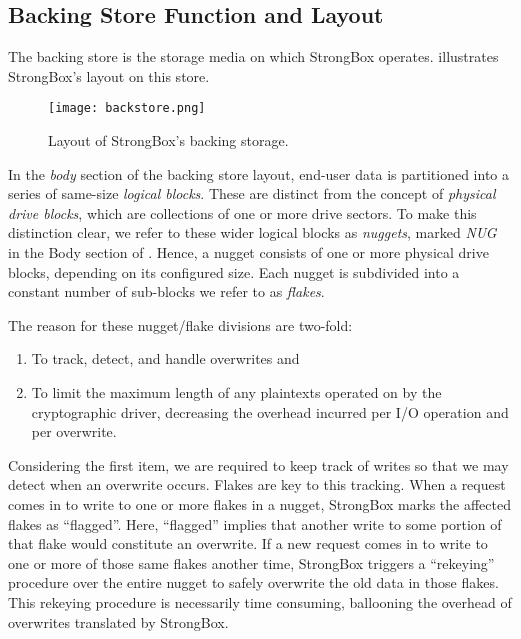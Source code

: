 \subsection{Backing Store Function and Layout}

The backing store is the storage media on which StrongBox operates.
 illustrates StrongBox's layout on this store.

\begin{figure}[t]
 \centering
  \texttt{[image: backstore.png]}
   \caption{Layout of StrongBox's backing storage.}\label{fig:backstore}
\end{figure}

In the \textit{body} section of the backing store layout, end-user data is
partitioned into a series of same-size \emph{logical blocks}. These are distinct
from the concept of \emph{physical drive blocks}, which are collections of one
or more drive sectors. To make this distinction clear, we refer to these wider
logical blocks as \emph{nuggets}, marked \textit{NUG} in the Body section of
. Hence, a nugget consists of one or more physical drive
blocks, depending on its configured size. Each nugget is subdivided into a
constant number of sub-blocks we refer to as \emph{flakes}.

The reason for these nugget/flake divisions are two-fold:

\begin{enumerate}

\item To track, detect, and handle overwrites and

\item To limit the maximum length of any plaintexts operated on by the
cryptographic driver, decreasing the overhead incurred per I/O operation and per
overwrite.

\end{enumerate}


Considering the first item, we are required to keep track of writes so that we
may detect when an overwrite occurs. Flakes are key to this tracking. When a
request comes in to write to one or more flakes in a nugget, StrongBox marks the
affected flakes as ``flagged''. Here, ``flagged'' implies that another write to
some portion of that flake would constitute an overwrite. If a new request comes
in to write to one or more of those same flakes another time, StrongBox triggers
a ``rekeying'' procedure over the entire nugget to safely overwrite the old data
in those flakes. This rekeying procedure is necessarily time consuming,
ballooning the overhead of overwrites translated by StrongBox.

